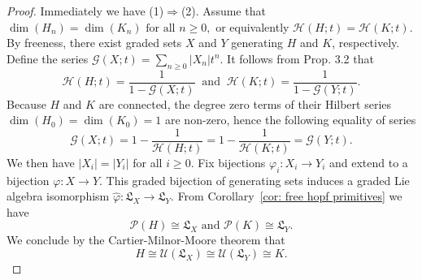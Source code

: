 \documentclass[11pt]{amsart}
\theoremstyle{definition}
\numberwithin{equation}{section}
\begin{document}
\begin{proof}
Immediately we have (1)$\Rightarrow$(2). Assume that $\dim(H_n)=\dim(K_n) \text{ for all } n\geq 0,$ or equivalently $\mathcal{H}(H;t)=\mathcal{H}(K;t).$ By freeness, there exist graded sets $X$ and $Y$ generating $H$ and $K$, respectively. Define the series $\mathcal{G}(X;t)=\sum_{n\geq 0}|X_n|t^n$. It follows from Prop. 3.2 that
\[
\mathcal{H}(H;t)=\frac{1}{1-\mathcal{G}(X;t)}\ \text{  and  }\ \mathcal{H}(K;t)=\frac{1}{1-\mathcal{G}(Y;t)}.
\]
Because $H$ and $K$ are connected, the degree zero terms of their Hilbert series $\dim(H_0)=\dim(K_0)=1$ are non-zero, hence the following equality of series
\[
\mathcal{G}(X;t)=1-\frac{1}{\mathcal{H}(H;t)}=1-\frac{1}{\mathcal{H}(K;t)}=\mathcal{G}(Y;t).
\]
We then have $|X_i|=|Y_i|$ for all $i\geq 0.$ Fix bijections $\varphi_i:X_i\to Y_i$ and extend to a bijection $\varphi:X\to Y$. This graded bijection of generating sets induces a graded Lie algebra isomorphism $\hat{\varphi}:\mathfrak{L}_X\to \mathfrak{L}_  Y$. From Corollary~\ref{cor: free hopf primitives} we have 
\[
\mathcal{P}(H)\cong \mathfrak{L}_X \text{ and } \mathcal{P}(K)\cong \mathfrak{L}_Y.
\]
We conclude by the Cartier-Milnor-Moore theorem that
\[
H\cong \mathcal{U}(\mathfrak{L}_X)\cong \mathcal{U}(\mathfrak{L}_Y)\cong K.
\]
\end{proof}
\end{document}
